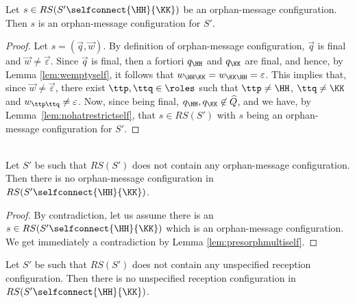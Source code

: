  \begin{lemma}%
\label{lem:presorphmultiself}
Let $s\in RS(S'\selfconnect{\HH}{\KK})$ be an orphan-message configuration.
Then
 $s$ is an  orphan-message configuration for $S'$.
\end{lemma}

\begin{proof}
Let $s= (\vec{q},\vec{w})$. By definition of orphan-message configuration, 
$\vec{q}$ is final and $\vec{w}\neq \vec{\varepsilon}$.
Since $\vec{q}$ is final, then a fortiori $q_\HH$ and $q_\KK$ are final, and hence, by Lemma \ref{lem:wemptyself},
 it follows that $w_{\HH\KK} = w_{\KK\HH} = \varepsilon$.
This implies that, since  $\vec{w}\neq \vec{\varepsilon}$,
there exist  $\ttp,\ttq\in \roles$ such that $\ttp\neq\HH$, $\ttq\neq\KK$ and $w_{\ttp\ttq}\neq\varepsilon$.
Now, since being final, $q_\HH, q_\KK\not\in\widehat{Q}$, and we have,
by Lemma~\ref{lem:nohatrestrictself}, that $s\in RS(S')$ with $s$  being an orphan-message configuration for $S'$.
\end{proof}

\begin{corollary}
\label{prop:nomPreservationself}\hfill\\
Let $S'$  be such that  $RS(S')$ does not contain any orphan-message configuration.
Then there is no orphan-message configuration in $RS(S'\selfconnect{\HH}{\KK})$.
\end{corollary}
\begin{proof}
By contradiction, let us assume there is an $s\in RS(S'\selfconnect{\HH}{\KK})$ which is an orphan-message configuration. We get
immediately a contradiction by Lemma \ref{lem:presorphmultiself}.
\end{proof}







\begin{proposition}
\label{prop:nurPreservationself}
Let $S'$ be such that  $RS(S')$ does not contain any unspecified reception configuration.
Then there is no unspecified reception configuration in $RS(S'\selfconnect{\HH}{\KK})$.
\end{proposition}


